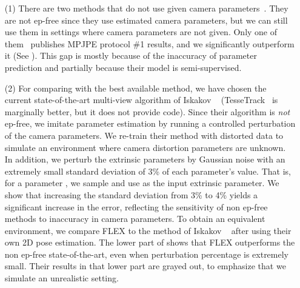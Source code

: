 \begin{enumerate}[nosep,leftmargin=0cm,itemindent=0.5cm,labelwidth=\itemindent,labelsep=0cm,align=left]
\item[(1)]
There are two methods that do not use given camera parameters~\cite{chu_and_pan_semisupervised,kocabas2019selfsupervised}. 
They are not ep-free since they use estimated camera parameters, but we can still use them in settings where camera parameters are not given.
Only one of them~\cite{chu_and_pan_semisupervised} publishes MPJPE protocol \#1 results, and we significantly outperform it
(See ). 
This gap is mostly because of the inaccuracy of parameter prediction and partially because their model is semi-supervised. 
    
\item[(2)] 
For comparing with the best available method, 
we have chosen the current state-of-the-art multi-view algorithm of Iskakov \etal~\cite{iskakov2019learnable} (TesseTrack~\cite{Reddy2021TesseTrackEL} is marginally better, but it does not provide code). Since their algorithm is \emph{not} ep-free, we
imitate parameter estimation by running a controlled perturbation of the camera parameters.
We re-train their method with distorted data to simulate an environment where camera distortion parameters are unknown. 
In addition, we perturb the 
extrinsic parameters by Gaussian noise with an extremely small standard deviation of 3\% of each parameter's 
value. That is, for a parameter , we sample  and use  as the input extrinsic parameter. 
We show that increasing the standard deviation from 3\% to 4\% yields a significant increase in the error, reflecting the sensitivity of non ep-free methods to  inaccuracy in camera parameters.
To obtain an equivalent environment, we compare FLEX to the method of Iskakov \etal~ after using their own 2D pose estimation.
The lower part of  shows that FLEX outperforms the non ep-free state-of-the-art, even when perturbation percentage is extremely small.
Their results
in that lower part 
are grayed out, to emphasize that we simulate an unrealistic setting.
\end{enumerate}





